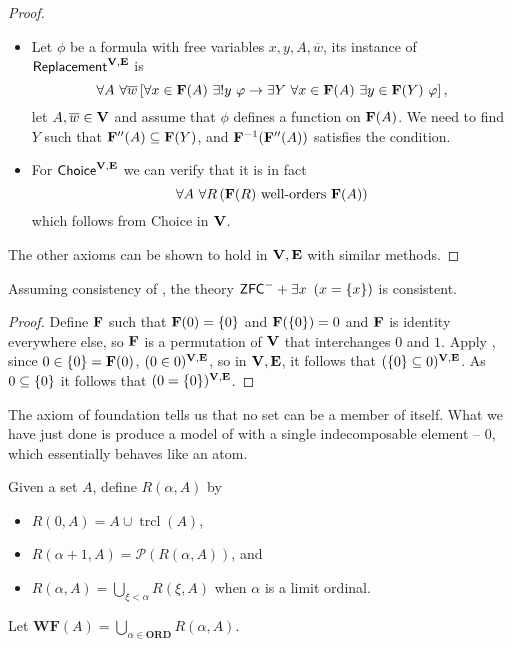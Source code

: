 \begin{proof}
\begin{itemize}
        \item Let \(\phi\) be a formula with free variables \(x,y,A,\overline{w}\), its instance of \(\textsf{Replacement}^{\mathbf{V},\mathbf{E}}\) is
            \[ \forall A~\forall \overline{w} \left[ 
                    \forall x\in\mathbf{F}(A) ~ \exists!y\ \varphi \rightarrow \exists Y~ \forall x\in \mathbf{F}(A)~ \exists y\in \mathbf{F}(Y)~ \varphi
                 \right],
            \]
            let \(A,\overline{w}\in \mathbf{V}\) and assume that \(\phi\) defines a function on \(\mathbf{F}(A)\).
            We need to find \(Y\) such that \(\mathbf{F}''(A) \subseteq \mathbf{F}(Y)\), and \(\mathbf{F}^{-1}(\mathbf{F}''(A))\) satisfies the condition.

        \item For \(\textsf{Choice}^{\mathbf{V},\mathbf{E}}\) we can verify that it is in fact
            \[ \forall A~\forall R\left(\mathbf{F}(R) \text{ well-orders } \mathbf{F}(A)\right) \]
            which follows from \textsf{Choice} in \(\mathbf{V}\).
    \end{itemize}
    The other axioms can be shown to hold in \(\mathbf{V},\mathbf{E}\) with similar methods.
\end{proof}

\begin{example}\label{babyAtomExample}
    Assuming consistency of \ZFC, the theory \(\mbox{\normalfont \textsf{ZFC}}^- + \exists x~\left(x = {\left\{ x \right\}}\right)\) is consistent.
\end{example}
\begin{proof}
    Define \(\mathbf{F}\) such that \(\mathbf{F}(0) = {\left\{ 0 \right\}}\) and \(\mathbf{F}({\left\{ 0 \right\}}) = 0\) and \(\mathbf{F}\) is identity everywhere else,
    so \(\mathbf{F}\) is a permutation of \(\mathbf{V}\) that interchanges \(0\) and \(1\).
    Apply ,
    since \(0 \in {\left\{ 0 \right\}} = \mathbf{F}(0)\), \((0\in 0)^{\mathbf{V},\mathbf{E}}\),
    so in \(\mathbf{V},\mathbf{E}\), it follows that \(({\left\{ 0 \right\}} \subseteq 0)^{\mathbf{V},\mathbf{E}}\).
    As \(0 \subseteq {\left\{ 0 \right\}}\) it follows that \((0 = {\left\{ 0 \right\}})^{\mathbf{V},\mathbf{E}}\).
\end{proof}

\newcommand{\WF}{\mathbf{WF}}
\newcommand{\trcl}{\operatorname{trcl}}
The axiom of foundation tells us that no set can be a member of itself.
What we have just done is produce a model of \ZFCminus with a single indecomposable element -- \(0\), which essentially behaves like an atom.

\begin{definition}
    Given a set \(A\), define \(R(\alpha,A)\) by
    \begin{itemize}
        \item \(R(0,A) = A \cup \operatorname{trcl}(A)\),
        \item \(R(\alpha+1, A) = \mathcal{P}(R(\alpha, A))\), and
        \item \(R(\alpha, A) = \bigcup_{\xi<\alpha} R(\xi, A)\) when \(\alpha\) is a limit ordinal.
    \end{itemize}
    Let \(\WF(A) = \bigcup_{\alpha\in\mathbf{ORD}} R(\alpha, A)\).
\end{definition}

